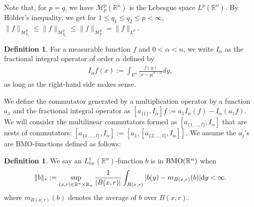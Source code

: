 \documentclass[11pt,a4]{article}
\numberwithin{equation}{section}
\theoremstyle{definition}
\newtheorem{definition}[theorem]{Definition}
\theoremstyle{remark}
\begin{document}
Note that, for $p=q$, we have $\mathcal{M}^p_p(\mathbb{R}^n)$ is the Lebesgue space $L^p(\mathbb{R}^n)$. By H\"{o}lder's inequality, we get for $1 \leq q_1 \leq q_2 \leq p < \infty$, $\| f \|_{{\mathcal M}^{p}_{q_1}} \leq \| f \|_{{\mathcal M}^{p}_{q_2}} \leq \| f \|_{{\mathcal M}^{p}_p} = \| f \|_{L^p}$.\\




\begin{definition}
	For a measurable function $f$ and $0 < \alpha < n$, we write $I_{\alpha} $ as the fractional integral operator of order $\alpha$ defined by
	\begin{align*}
		I_{\alpha}f(x):=\int_{{\mathbb R}^n} \frac{f(y)}{|x-y|^{n-\alpha}}dy,
	\end{align*}
	as long as the right-hand side makes sense.
\end{definition}




We define the commutator generated by a multiplication operator by a function $a_1$ and the fractional integral operator as $[a_{\{1\}},I_{\alpha}]f:=a_1I_{\alpha}(f)-I_{\alpha}(a_1f)$. We will consider the multilinear commutators formed as $[a_{\{1,...,l\}},I_{\alpha }]$ that are nests of commutators: $[a_{\{1,...,l\}},I_{\alpha}]:=[a_1,[a_{\{2,...,l\}},I_{\alpha}]]$. We assume the   $a_j$'s are BMO-functions defined as follows:







\begin{definition}
We say an $L_{loc}^1({\mathbb R}^n)$-function $b$ is in ${\rm BMO}({\mathbb R}^n)$ when
	\[
		\|b\|_* 
		:=
		\sup\limits_{(x,r) \in {\mathbb R}^{n} \times \mathbb{R}_+}
		\frac{1}{|B(x,r)|}\int_{B(x,r)}|b(y)-m_{B(x,r)}(b)|{\rm d}y<\infty.
	\]
where $m_{B(x,r)}(b)$ denotes the average of $b$ over $B(x,r)$.
\end{definition}
\end{document}
